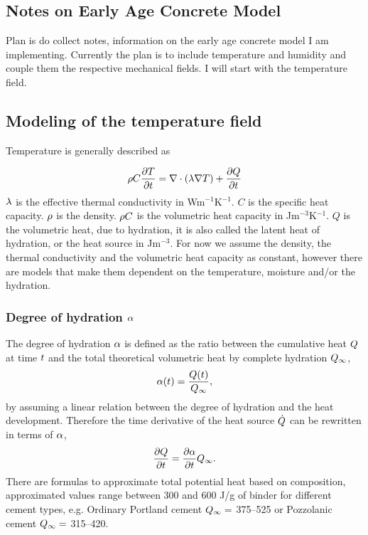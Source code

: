 
\subsection{Notes on Early Age Concrete Model}
Plan is do collect notes, information on the early age concrete model I am implementing.
Currently the plan is to include temperature and humidity and couple them the respective mechanical fields.
I will start with the temperature field.

\subsection{Modeling of the temperature field}
Temperature is generally described as

\begin{align}
	\rho C \frac{\partial T}{\partial t} = \nabla \cdot (\lambda \nabla T) + \frac{\partial Q}{\partial t} \label{eq:heat1}
\end{align}
$\lambda$ is the effective thermal conductivity in Wm$^{-1}$K$^{-1}$.
$C$ is the specific heat capacity.
$\rho$ is the density.
$\rho C$ is the volumetric heat capacity in Jm$^{-3}$K$^{-1}$.
$Q$ is the volumetric heat, due to hydration, it is also called the latent heat of hydration, or the heat source in Jm$^{-3}$.
For now we assume the density, the thermal conductivity and the volumetric heat capacity as constant, however there are models that make them dependent on the temperature, moisture and/or the hydration.


\subsubsection{Degree of hydration\texorpdfstring{ $\alpha$}{}}
The degree of hydration $\alpha$ is defined as the ratio between the cumulative heat $Q$ at time $t$ and the total theoretical volumetric heat by complete hydration $Q_{\infty}$,
\begin{align}
	\alpha(t) = \frac{Q(t)}{Q_{\infty}}, \label{eq:doh}
\end{align}
by assuming a linear relation between the degree of hydration and the heat development.
Therefore the time derivative of the heat source $\dot{Q}$ can be rewritten in terms of $\alpha$, 
\begin{align}
	\frac{\partial Q}{\partial t} = \frac{\partial \alpha}{\partial t} Q_{\infty}. \label{eq:qdotalphadot}
\end{align}
There are formulas to approximate total potential heat based on composition, approximated values range between 300 and 600 J/g of binder for different cement types, e.g. Ordinary Portland cement $Q_{\infty} =$ 375–525 or Pozzolanic cement $Q_{\infty} =$ 315–420.  

